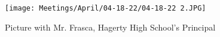 \begin{figure}[htp]
\centering
\texttt{[image: Meetings/April/04-18-22/04-18-22 2.JPG]}
\caption{Picture with Mr. Frasca, Hagerty High School's Principal}
\label{fig:041822_2}
\end{figure}




